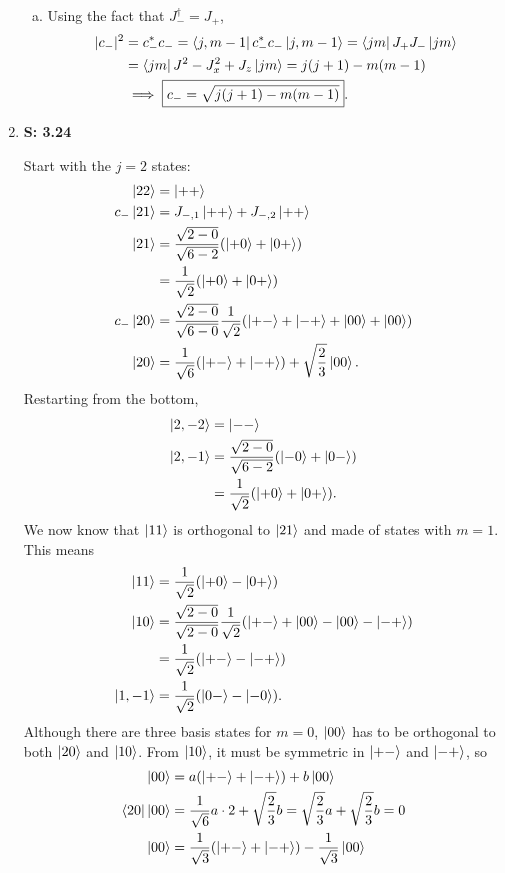 \documentclass[12pt, letterpaper]{article}
\begin{document}
\begin{enumerate}
\begin{enumerate}[(a)]
\item 
Using the fact that $J_-^\dag = J_+$,
\begin{align}
|c_-|^2 &= c_-^\ast c_- = \bra{j,m-1} c_-^\ast c_-\ket{j,m-1} = 
    \bra{jm}J_+J_-\ket{jm} \\ 
&= \bra{jm}J^2 - J_x^2 + J_z\ket{jm} = j(j+1) - m(m-1)\\
&\implies \boxed{c_- = \sqrt{j(j+1) - m(m-1)}}.
\end{align}
\end{enumerate}


    \item[] \textbf{S: 3.24}
    
Start with the $j=2$ states:
\begin{align}
\ket{22} &= \ket{++}\\
c_-\ket{21} &= J_{-,1}\ket{++} + J_{-,2}\ket{++}\\
\ket{21} &= \frac{\sqrt{2-0}}{\sqrt{6-2}}(\ket{+0} + \ket{0+})\\
&= \frac{1}{\sqrt{2}}(\ket{+0} + \ket{0+})\\
c_-\ket{20} &= \frac{\sqrt{2-0}}{\sqrt{6-0}}\frac{1}{\sqrt{2}}(\ket{+-}+\ket{-+}+
    \ket{00}+\ket{00})\\
\ket{20}&= \frac{1}{\sqrt{6}}(\ket{+-}+\ket{-+}) + \sqrt{\frac{2}{3}}\ket{00}.
\end{align}
Restarting from the bottom,
\begin{align}
\ket{2,-2} &= \ket{--}\\
\ket{2,-1} &= \frac{\sqrt{2-0}}{\sqrt{6-2}}(\ket{-0} + \ket{0-})\\
&= \frac{1}{\sqrt{2}}(\ket{+0} + \ket{0+}).
\end{align}
We now know that $\ket{11}$ is orthogonal to $\ket{21}$ and made of states with $m=1$. This means
\begin{align}
\ket{11} &= \frac{1}{\sqrt{2}}(\ket{+0}-\ket{0+})\\
\ket{10} &= \frac{\sqrt{2-0}}{\sqrt{2-0}}\frac{1}{\sqrt{2}}
    (\ket{+-}+\ket{00}-\ket{00}-\ket{-+})\\
&= \frac{1}{\sqrt{2}}(\ket{+-}-\ket{-+})\\
\ket{1,-1} &= \frac{1}{\sqrt{2}}(\ket{0-}-\ket{-0}).
\end{align}
Although there are three basis states for $m=0$, $\ket{00}$ has to be orthogonal to both $\ket{20}$ and $\ket{10}$. From $\ket{10}$, it must be symmetric in $\ket{+-}$ and $\ket{-+}$, so
\begin{align}
\ket{00} &= a(\ket{+-}+\ket{-+}) + b\ket{00}\\
\bra{20}\ket{00} &= \frac{1}{\sqrt{6}}a\cdot2+\sqrt{\frac{2}{3}}b = 
    \sqrt{\frac{2}{3}}a+\sqrt{\frac{2}{3}}b=0\\
\ket{00} &= \frac{1}{\sqrt{3}}(\ket{+-}+\ket{-+}) - \frac{1}{\sqrt{3}}\ket{00}
\end{align}


\end{enumerate}
\end{document}
